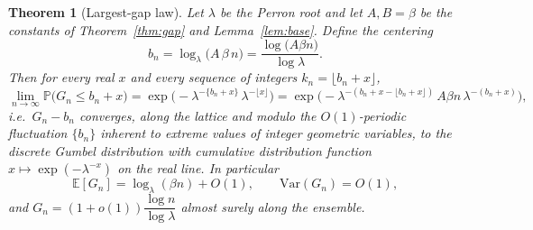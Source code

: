 \documentclass[12pt]{article}
\newtheorem{theorem}{Theorem}
\theoremstyle{definition}
\newcommand{\E}{\mathbb{E}}
\newcommand{\Prob}{\mathbb{P}}
\begin{document}
\begin{theorem}[Largest-gap law]\label{thm:max}
Let $\lambda$ be the Perron root and let $A,B=\beta$ be the constants of
Theorem~\ref{thm:gap} and Lemma~\ref{lem:base}. Define the centering
\begin{equation}\label{eq:center}
b_n=\log_\lambda\!\big(A\,\beta\,n\big)
   =\frac{\log\!\big(A\beta n\big)}{\log\lambda}.
\end{equation}
Then for every real $x$ and every sequence of integers $k_n=\lfloor b_n+x\rfloor$,
\begin{equation}\label{eq:gumbel}
\lim_{n\to\infty}\Prob\!\big(G_n\le b_n+x\big)
=\exp\!\big(-\lambda^{-\{b_n+x\}}\,\lambda^{-\lfloor x\rfloor}\big)
=\exp\!\big(-\lambda^{-(b_n+x-\lfloor b_n+x\rfloor)}\,A\beta n\,\lambda^{-(b_n+x)}\big),
\end{equation}
i.e.\ $G_n-b_n$ converges, along the lattice and modulo the
$O(1)$-periodic fluctuation $\{b_n\}$ inherent to extreme values of integer
geometric variables, to the discrete Gumbel distribution with cumulative
distribution function $x\mapsto \exp(-\lambda^{-x})$ on the real line. In
particular
\begin{equation}\label{eq:meanmax}
\E[G_n]=\log_\lambda(\beta n)+O(1),\qquad \mathrm{Var}(G_n)=O(1),
\end{equation}
and $G_n=(1+o(1))\dfrac{\log n}{\log\lambda}$ almost surely along the ensemble.
\end{theorem}
\end{document}
